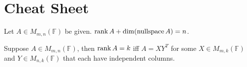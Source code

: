 \newpage
\section{Cheat Sheet}
  \begin{thm}
    Let $A\in M_{m,n}(\mathbb{F})$ be given. $\operatorname{rank} A + \dim(\operatorname{nullspace} A) = n$.
  \end{thm}

  \begin{lemma}
    Suppose $A\in M_{m,n}(\mathbb{F})$, then $\operatorname{rank} A = k$ iff $A=XY^T$ for some
    $X\in M_{m,k}(\mathbb{F})$ and $Y\in M_{n,k}(\mathbb{F})$ that each have 
    independent columns.
  \end{lemma}


